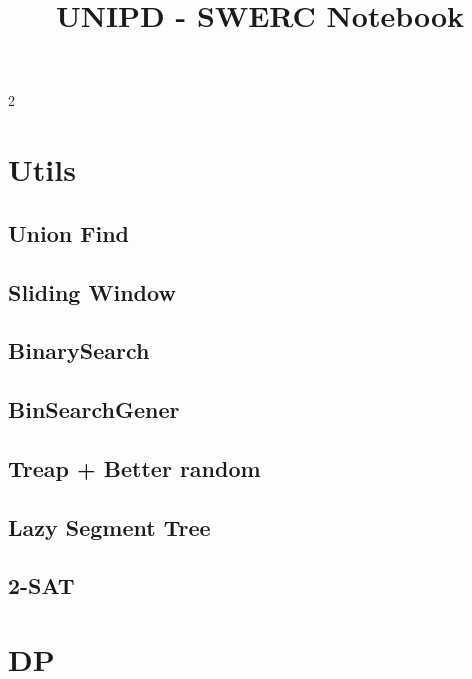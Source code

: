 \documentclass[10pt, a4paper]{article}
\title{\vspace{-4ex}\Large{UNIPD - SWERC Notebook}}
\author{}
\date{}
\begin{document}
\begin{landscape}
\begin{multicols}{2}

\maketitle
\vspace{-13ex}
\setcounter{tocdepth}{1}
\tableofcontents
\pagestyle{fancy}

\section{Utils}

\subsection{Union Find}
\raggedbottom
\subsection{ Sliding Window }
\raggedbottom
\subsection{BinarySearch}
\raggedbottom
\subsection{BinSearchGener}
\raggedbottom
\subsection{Treap + Better random}
\raggedbottom
\subsection{Lazy Segment Tree}
\subsection{2-SAT}
\raggedbottom

\section{DP}

\end{multicols}
\end{landscape}
\end{document}
